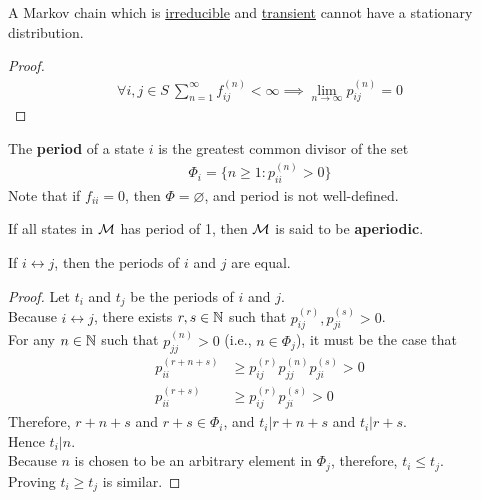 \documentclass{article}
\newcommand{\upn}[0]{^{(n)}}
\begin{document}
	\begin{corollary}
		A Markov chain which is \ul{irreducible} and \ul{transient} cannot have a stationary distribution.
	\end{corollary}
	
	\begin{proof}
		\begin{align}
			\forall i, j \in S\ \sum_{n=1}^\infty f_{ij}\upn < \infty \implies \lim_{n\to\infty}p_{ij}\upn = 0
		\end{align}
	\end{proof}
	
	\begin{definition}
		The \textbf{period} of a state $i$ is the greatest common divisor of the set
		\begin{align}
			\Phi_i = \{n \geq 1: p_{ii}\upn > 0\}
		\end{align}
		Note that if $f_{ii} = 0$, then $\Phi = \varnothing$, and period is not well-defined.
	\end{definition}
	
	\begin{definition}
		If all states in $\mathcal{{M}}$ has period of 1, then $\mathcal{{M}}$ is said to be \textbf{aperiodic}.
	\end{definition}
	
	\begin{lemma}
		If $i \leftrightarrow j$, then the periods of $i$ and $j$ are equal.
	\end{lemma}
	
	\begin{proof}
		Let $t_i$ and $t_j$ be the periods of $i$ and $j$. \\
		Because $i \leftrightarrow j$, there exists $r, s \in \mathbb{N}$ such that $p_{ij}^{(r)}, p_{ji}^{(s)} > 0$. \\
		For any $n \in \mathbb{N}$ such that $p_{jj}\upn > 0$ (i.e., $n \in \Phi_j$), it must be the case that
		\begin{align}
			p^{(r+n+s)}_{ii} &\geq p_{ij}^{(r)} p_{jj}\upn p_{ji}^{(s)} > 0 \\
			p^{(r+s)}_{ii} &\geq p_{ij}^{(r)} p_{ji}^{(s)} > 0
		\end{align}
		Therefore, $r+n+s$ and $r + s \in \Phi_i$, and $t_i | r + n + s$ and $t_i | r + s$. \\
		Hence $t_i | n$. \\
		Because $n$ is chosen to be an arbitrary element in $\Phi_j$, therefore, $t_i \leq t_j$. \\
		Proving $t_i \geq t_j$ is similar. 
	\end{proof}
	
\end{document}
